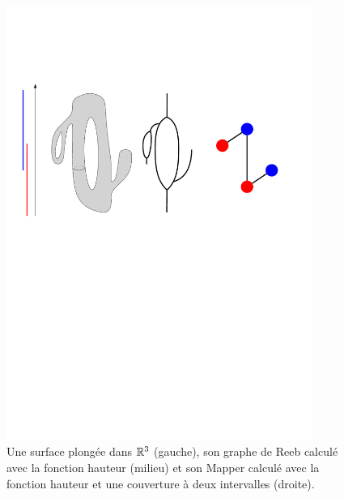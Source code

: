 
\begin{figure}[h]\centering
\includegraphics[width=10cm]{figures/ExamplePixelization}
\caption[Mapper vu comme une pixelisation du graphe de Reeb]{\label{fig:pixelizationM} 
Une surface plong\'ee dans $\mathbb{R}^3$ (gauche), son graphe de Reeb calcul\'e avec la fonction hauteur (milieu)
et son Mapper calcul\'e avec la fonction hauteur et une couverture \`a deux intervalles (droite).}
\end{figure}

